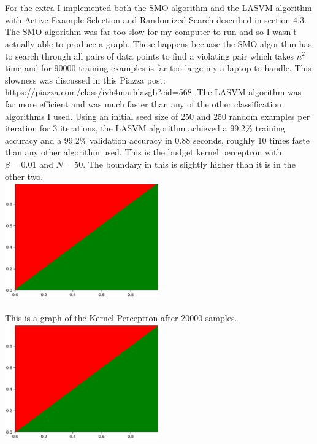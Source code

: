 \documentclass[submit]{harvardml}
\begin{document}
\begin{enumerate}
	\\\\
	For the extra I implemented both the SMO algorithm and the LASVM algorithm with Active Example Selection and Randomized Search described in section 4.3.  The SMO algorithm was far too slow for my computer to run and so I wasn't actually able to produce a graph.  These happens becuase the SMO algorithm has to search through all pairs of data points to find a violating pair which takes $n^2$ time and for 90000 training examples is far too large my a laptop to handle. This slowness was discussed in this Piazza post: https://piazza.com/class/ivh4marhlazgb?cid=568.  The LASVM algorithm was far more efficient and was much faster than any of the other classification algorithms I used.  Using an initial seed size of 250 and 250 random examples per iteration for 3 iterations, the LASVM algorithm achieved a 99.2\% training accuracy and a 99.2\% validation accuracy in 0.88 seconds, roughly 10 times faste than any other algorithm used.   
	\newpage 
	This is the budget kernel perceptron with $\beta = 0.01$ and $N = 50$.  The boundary in this is slightly higher than it is in the other two.  \\
	\includegraphics[width=0.5\textwidth]{bk.eps} \\\\
	This is a graph of the Kernel Perceptron after 20000 samples. \\
	\includegraphics[width=0.5\textwidth]{k.eps} \\\\

\end{enumerate}
\end{document}
